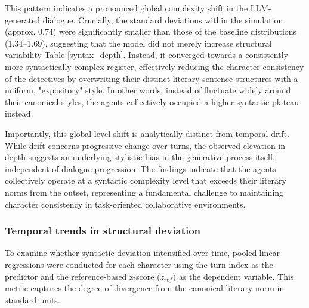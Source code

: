 \documentclass{article}
\begin{document}
\begin{table}[H]
\centering
{}%
\caption{Mean Syntactic Depth and Deviation from Literary Baseline by Character}
\label{syntax_depth}
\end{table}

This pattern indicates a pronounced global complexity shift in the LLM-generated dialogue. Crucially, the standard deviations within the simulation (approx. 0.74) were significantly smaller than those of the baseline distributions (1.34–1.69), suggesting that the model did not merely increase structural variability Table \ref{syntax_depth}. Instead, it converged towards a consistently more syntactically complex register, effectively reducing the character consistency of the detectives by overwriting their distinct literary sentence structures with a uniform, "expository" style. In other words, instead of fluctuate widely around their canonical styles, the agents collectively occupied a higher syntactic plateau instead.

Importantly, this global level shift is analytically distinct from temporal drift. While drift concerns progressive change over turns, the observed elevation in depth suggests an underlying stylistic bias in the generative process itself, independent of dialogue progression. The findings indicate that the agents collectively operate at a syntactic complexity level that exceeds their literary norms from the outset, representing a fundamental challenge to maintaining character consistency in task-oriented collaborative environments.


\subsubsection{Temporal trends in structural deviation}

To examine whether syntactic deviation intensified over time, pooled linear regressions were conducted for each character using the turn index as the predictor and the reference-based z-score ($z_{ref}$) as the dependent variable. This metric captures the degree of divergence from the canonical literary norm in standard units.
\end{document}
